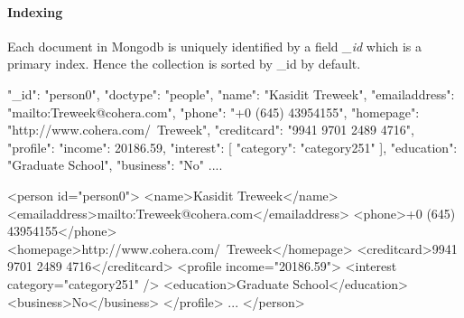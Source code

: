 \paragraph{Indexing} 
	Each document in Mongodb is uniquely identified by a field \textit{\_id} which is a primary index. Hence the collection is sorted by \_id by default. ~\cite{nosql/comparision}
	


\begin{fakeJSON}[label=json,caption=Mongodb data representation of XMARk data]
{
	"_id": "person0",
	"doctype": "people",
	"name": "Kasidit Treweek",
	"emailaddress": "mailto:Treweek@cohera.com",
	"phone": "+0 (645) 43954155",
	"homepage": "http://www.cohera.com/~Treweek",
	"creditcard": "9941 9701 2489 4716",
	"profile": {
		"income": 20186.59,
		"interest": [{
			"category": "category251"
		}],
		"education": "Graduate School",
		"business": "No"
	}
	....
}
\end{fakeJSON} 

\begin{fakeXML}[label=xml,caption=XMARK data with of \textit{person0}]
	
	<person id="person0">
	<name>Kasidit Treweek</name>
	<emailaddress>mailto:Treweek@cohera.com</emailaddress>
	<phone>+0 (645) 43954155</phone>
	<homepage>http://www.cohera.com/~Treweek</homepage>
	<creditcard>9941 9701 2489 4716</creditcard>
	<profile income="20186.59">
	<interest category="category251" />
	<education>Graduate School</education>
	<business>No</business>
	</profile>
	...
	</person>
\end{fakeXML} 

	

	
	
